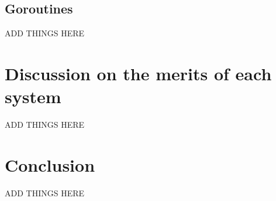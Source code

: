 \documentclass{acm_proc_article-sp}
\begin{document}
	\subsection{Goroutines}
		ADD THINGS HERE
		
\section{Discussion on the merits of each system}
	ADD THINGS HERE
	
\section{Conclusion}
	ADD THINGS HERE



\end{document}
